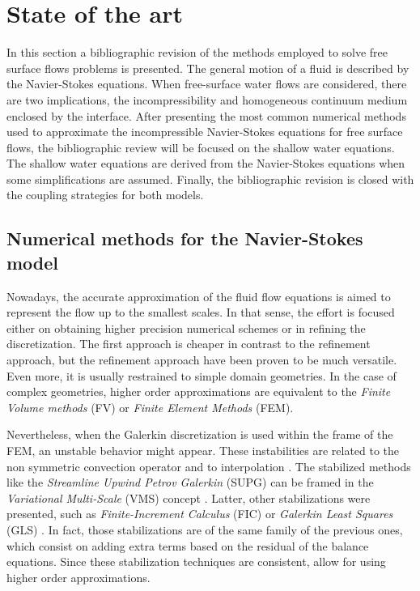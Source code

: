 
\section{State of the art}
\label{state_art}


In this section a bibliographic revision of the methods employed to solve free surface flows problems is presented.
The general motion of a fluid is described by the Navier-Stokes equations. When free-surface water flows are considered, there are two implications, the incompressibility and homogeneous continuum medium enclosed by the interface. After presenting the most common numerical methods used to approximate the incompressible Navier-Stokes equations for free surface flows, the bibliographic review will be focused on the shallow water equations.
The shallow water equations are derived from the Navier-Stokes equations when some simplifications are assumed.
Finally, the bibliographic revision is closed with the coupling strategies for both models.



\subsection{Numerical methods for the Navier-Stokes model}


Nowadays, the accurate approximation of the fluid flow equations is aimed to represent the flow up to the smallest scales. In that sense, the effort is focused either on obtaining higher precision numerical schemes or in refining the discretization. The first approach is cheaper in contrast to the refinement approach, but the refinement approach have been proven to be much versatile. Even more, it is usually restrained to simple domain geometries. In the case of complex geometries, higher order approximations are equivalent to the \emph{Finite Volume methods} (FV) or \emph{Finite Element Methods} (FEM).

Nevertheless, when the Galerkin discretization is used within the frame of the FEM, an unstable behavior might appear. These instabilities are related to the non symmetric convection operator and to interpolation \cite{brezzi1991,codina2008oseen}. The stabilized methods like the \emph{Streamline Upwind Petrov Galerkin} (SUPG) \cite{hughes1986iii,brooks1982} can be framed in the \emph{Variational Multi-Scale} (VMS) concept \cite{hughes1995}. Latter, other stabilizations were presented, such as \emph{Finite-Increment Calculus} (FIC) \cite{onate1998} or \emph{Galerkin Least Squares} (GLS) \cite{hughes1989}. In fact, those stabilizations are of the same family of the previous ones, which consist on adding extra terms based on the residual of the balance equations. Since these stabilization techniques are consistent, allow for using higher order approximations.

